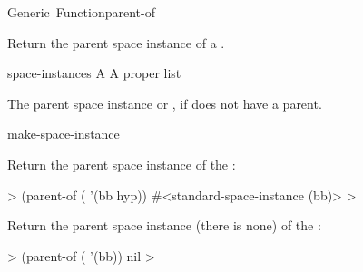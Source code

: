 \documentclass[10pt,twoside,english,pdftex]{article}
\begin{document}
\begin{functiondoc}{Generic~Function}{parent-of}%
  {
    \returns{} }
%

\fnsyntax

\fnpurpose Return the parent space instance of a .

\fnmethods
{}%
  {\code{(} 
    \returns{} }

\fnpackage {}

\fnmodule {}

\fnargs
\begin{args}{space-instances}
 A 
 A proper list
\end{args}

\fnreturns The parent space instance or \nil, if  does not
have a parent.

\begin{alsos}{make-space-instance}
\also[children-of]
\end{alsos}

\fnexamples {}%
%
Return the parent space instance of the 
:
%
\W\supp
\begin{example}
  > (parent-of ( '(bb hyp))
  #<standard-space-instance (bb)>
  >
\end{example}
%
Return the parent space instance (there is none) of
the  :
%
\W\supp\notpretop
\begin{example}
  > (parent-of ( '(bb))
  nil
  >
\end{example}

\end{functiondoc}

\end{document}
